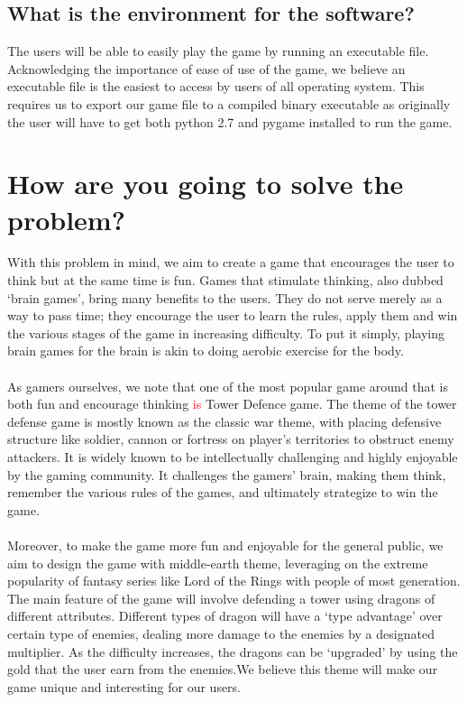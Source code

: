 \documentclass[12pt]{article}
\begin{document}
    \subsection {What is the environment for the software?}
    The users will be able to easily play the game by running an executable file. Acknowledging the importance of ease of use of the game, we believe an executable file is the easiest to access by users of all operating system. This requires us to export our game file to a compiled binary executable as originally the user will have to get both python 2.7 and pygame installed to run the game.

\section{How are you going to solve the problem?}
With this problem  in mind, we aim to create a game that encourages the user to think but at the same time is fun. Games that stimulate thinking, also dubbed ‘brain games’, bring many benefits to the users. They do not serve merely as a way to pass time; they encourage the user to learn the rules, apply them and win the various stages of the game in increasing difficulty. To put it simply, playing brain games for the brain is akin to doing aerobic exercise for the body.\\\\As gamers ourselves, we note that one of the most popular game around that is both fun and encourage thinking \textcolor{red}{is} Tower Defence game. The theme of the tower defense game is mostly known as the classic war theme, with placing defensive structure like soldier, cannon or fortress on player’s territories to obstruct enemy attackers. It is widely known to be intellectually challenging and highly enjoyable by the gaming community. It challenges the gamers’ brain, making them think, remember the various rules of the games, and ultimately strategize to win the game.\\\\Moreover, to make the game more fun and enjoyable for the general public, we aim to design the game with middle-earth theme, leveraging on the extreme popularity of fantasy series like Lord of the Rings with people of most generation. The main feature of the game will involve defending a tower using dragons of different attributes. Different types of dragon will have a ‘type advantage’ over certain type of enemies, dealing more damage to the enemies by a designated multiplier. As the difficulty increases, the dragons can be ‘upgraded’ by using the gold that the user earn from the enemies.We believe this theme will make our game unique and interesting for our users.
\end{document}
